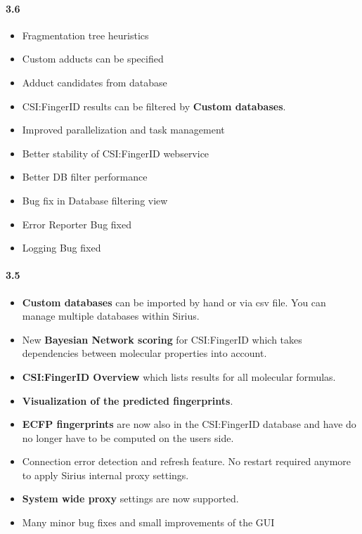 \paragraph{3.6}
\begin{itemize}
\item
    Fragmentation tree heuristics
\item
    Custom adducts can be specified
\item
    Adduct candidates from database
\item
  CSI:FingerID results can be filtered by \textbf{Custom databases}.
\item
  Improved parallelization and task management
\item
  Better stability of CSI:FingerID webservice
\item
  Better DB filter performance
\item
  Bug fix in Database filtering view
\item
  Error Reporter Bug fixed
\item
  Logging Bug fixed
\end{itemize}


\paragraph{3.5}

\begin{itemize}

\item
  \textbf{Custom databases} can be imported by hand or via csv file. You
  can manage multiple databases within Sirius.
\item
  New \textbf{Bayesian Network scoring} for CSI:FingerID which takes
  dependencies between molecular properties into account.
\item
  \textbf{CSI:FingerID Overview} which lists results for all molecular
  formulas.
\item
  \textbf{Visualization of the predicted fingerprints}.
\item
  \textbf{ECFP fingerprints} are now also in the CSI:FingerID database
  and have do no longer have to be computed on the users side.
\item
  Connection error detection and refresh feature. No restart required
  anymore to apply Sirius internal proxy settings.
\item
  \textbf{System wide proxy} settings are now supported.
\item
  Many minor bug fixes and small improvements of the GUI
\end{itemize}


